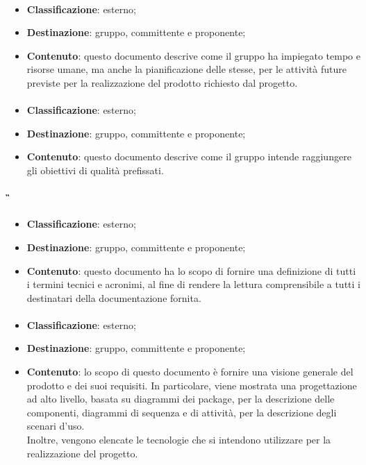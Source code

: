 			\paragraph{\PdP}
			\begin{itemize}
				\item \textbf{Classificazione}: esterno;
				\item \textbf{Destinazione}: gruppo, committente e proponente;
				\item \textbf{Contenuto}: questo documento descrive come il gruppo \textit{\gruppo} ha impiegato tempo e risorse umane, ma anche la pianificazione delle stesse, per le attività future previste per la realizzazione del prodotto richiesto dal progetto.
			\end{itemize}

			\paragraph{\PdQ}
			\begin{itemize}
				\item \textbf{Classificazione}: esterno;
				\item \textbf{Destinazione}: gruppo, committente e proponente;
				\item \textbf{Contenuto}: questo documento descrive come il gruppo \textit{\gruppo} intende raggiungere gli obiettivi di qualità prefissati.
			\end{itemize}

			\paragraph{\G}
			\begin{itemize}
				\item \textbf{Classificazione}: esterno;
				\item \textbf{Destinazione}: gruppo, committente e proponente;
				\item \textbf{Contenuto}: questo documento ha lo scopo di fornire una definizione di tutti i termini tecnici e acronimi, al fine di rendere la lettura comprensibile a tutti i destinatari della documentazione fornita.
			\end{itemize}
		\paragraph{\ST}
		\begin{itemize}
			\item \textbf{Classificazione}: esterno;
			\item \textbf{Destinazione}: gruppo, committente e proponente;
			\item \textbf{Contenuto}: lo scopo di questo documento è fornire una visione generale del prodotto e dei suoi requisiti. In particolare, viene mostrata una progettazione ad
			alto livello, basata su diagrammi dei package, per la descrizione delle componenti, diagrammi di sequenza e di attività, per la descrizione degli scenari d'uso.\\
			Inoltre, vengono elencate le tecnologie che si intendono utilizzare per la realizzazione del progetto.
		\end{itemize}
		
